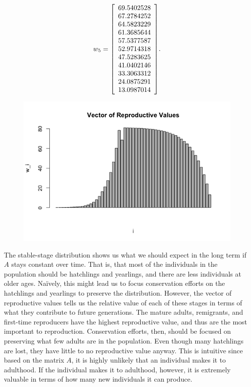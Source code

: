 \documentclass{article} %
\theoremstyle{plain}
\numberwithin{equation}{section} %
\numberwithin{figure}{section} %
\numberwithin{table}{section} %
\begin{document}
\begin{enumerate}[\ \ (a)]
\begin{align}
            w_5 = \qty[\begin{array}{c}69.5402528 \\ 67.2784252 \\ 64.5823229 \\ 61.3685644 \\ 57.5377587 \\ 52.9714318 \\ 47.5283625 \\ 41.0402146 \\ 33.3063312 \\ 24.0875291 \\ 13.0987014\end{array}].
        \end{align}
        \begin{figure}[ht!]
            \centering
            \includegraphics[scale=0.45]{figure_1b.png}
        \end{figure}
        \FloatBarrier
        The stable-stage distribution shows us what we should expect in the long term if $A$ stays constant over time.  That is, that most of the individuals in the population should be hatchlings and yearlings, and there are less individuals at older ages.  Na\"{i}vely, this might lead us to focus conservation efforts on the hatchlings and yearlings to preserve the distribution.  However, the vector of reproductive values tells us the relative value of each of these stages in terms of what they contribute to future generations.  The mature adults, remigrants, and first-time reproducers have the highest reproductive value, and thus are the most important to reproduction.  Conservation efforts, then, should be focused on preserving what few adults are in the population.  Even though many hatchlings are lost, they have little to no reproductive value anyway.  This is intuitive since based on the matrix $A$, it is highly unlikely that an individual makes it to adulthood.  If the individual makes it to adulthood, however, it is extremely valuable in terms of how many new individuals it can produce.

\end{enumerate}
\end{document}
